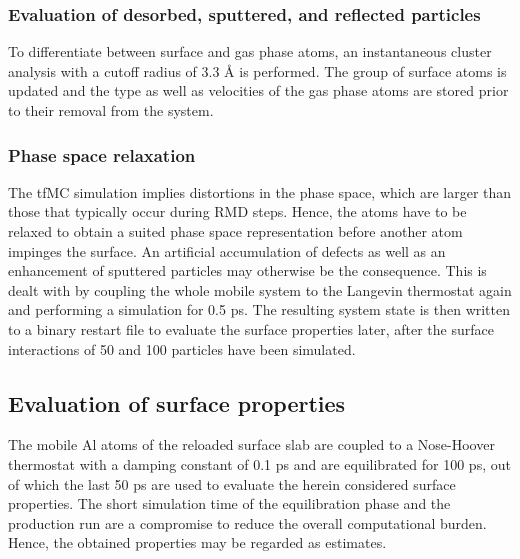 \documentclass[12pt,a4paper,preprint,superscriptaddress]{revtex4-1}
\begin{document}
\subsubsection{Evaluation of desorbed, sputtered, and reflected particles}
\label{sssec:diagnosing}

To differentiate between surface and gas phase atoms, an instantaneous cluster analysis with a cutoff radius of 3.3 \r A is performed. The group of surface atoms is updated and the type as well as velocities of the gas phase atoms are stored prior to their removal from the system.

\subsubsection{Phase space relaxation}
\label{sssec:phase_space_relaxation}

The tfMC simulation implies distortions in the phase space, which are larger than those that typically occur during RMD steps. Hence, the atoms have to be relaxed to obtain a suited phase space representation before another atom impinges the surface. An artificial accumulation of defects as well as an enhancement of sputtered particles may otherwise be the consequence. This is dealt with by coupling the whole mobile system to the Langevin thermostat again and performing a simulation for 0.5 ps. The resulting system state is then written to a binary restart file to evaluate the surface properties later, after the surface interactions of 50 and 100 particles have been simulated.

\subsection{Evaluation of surface properties}
\label{ssec:evaluation_sproperties}

The mobile Al atoms of the reloaded surface slab are coupled to a Nose-Hoover thermostat with a damping constant of 0.1 ps and are equilibrated for 100 ps, out of which the last 50 ps are used to evaluate the herein considered surface properties. The short simulation time of the equilibration phase and the  production run are a compromise to reduce the overall computational burden. Hence, the obtained properties may be regarded as estimates. 
\end{document}
